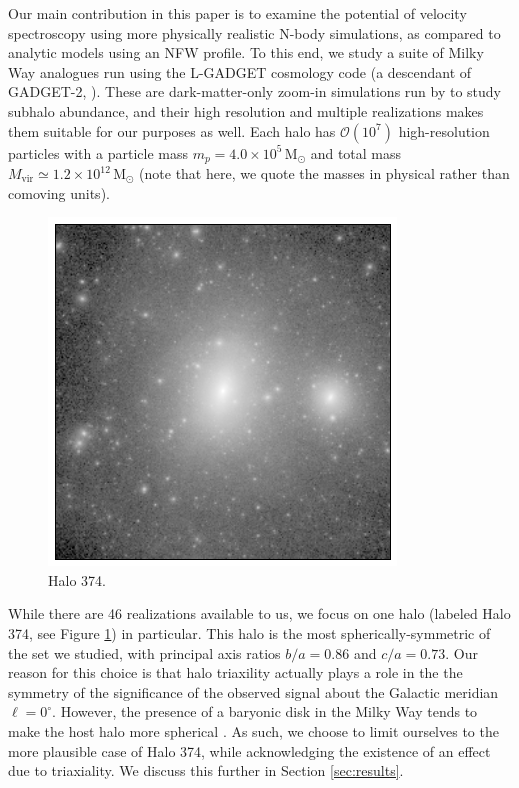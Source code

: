 \documentclass[aps,prl,10pt,twocolumn,superscriptaddress,showpacs]{revtex4-1}
\begin{document}
Our main contribution in this paper is to examine the potential of velocity spectroscopy using
more physically realistic N-body simulations, as compared to analytic models using an NFW profile.
To this end, we study a suite of Milky Way analogues run using the L-GADGET cosmology code
(a descendant of GADGET-2, \cite{springel2005}). These are dark-matter-only zoom-in simulations 
run by \cite{mao2015} to study subhalo abundance, and their high resolution and multiple
realizations makes them suitable for our purposes as well. Each halo has $\mathcal{O}(10^7)$
high-resolution particles with a particle mass $m_p=4.0\times10^5\, \mathrm{M_{\odot}}$ and total 
mass $M_{\mathrm{vir}}\simeq1.2\times10^{12}\,\mathrm{M_{\odot}}$ (note that here, we quote the masses in physical rather than comoving
units).

\begin{figure}[h!]
\centering
\includegraphics[width=0.9\columnwidth]{halo374.png}
\caption{Halo 374.}
\label{fig:halo374}
\end{figure}

While there are 46 realizations available to us, we focus on one halo (labeled Halo 374, see Figure
\ref{fig:halo374}) in particular. 
This halo is the most spherically-symmetric of the set we studied, with principal axis ratios
$b/a=0.86$ and $c/a=0.73$. Our reason for this choice is that halo triaxility actually plays a role
in the the symmetry of the significance of the observed signal about the Galactic meridian $\ell=0^{\circ}$.
However, the presence of a baryonic disk in the Milky Way tends to make the host
halo more spherical \cite{debattista2008, bryan2013}. As such, we choose to limit ourselves to the more plausible case of
Halo 374, while acknowledging the existence of an effect due to triaxiality. 
We discuss this further in Section \ref{sec:results}.
\end{document}

